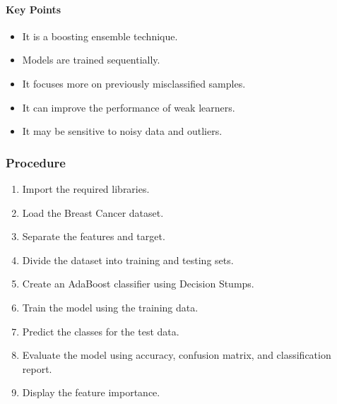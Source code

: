\documentclass[a4paper,11pt]{article}
\begin{document}
\paragraph{Key Points}
\begin{itemize}
    \item It is a boosting ensemble technique.
    \item Models are trained sequentially.
    \item It focuses more on previously misclassified samples.
    \item It can improve the performance of weak learners.
    \item It may be sensitive to noisy data and outliers.
\end{itemize}

\subsubsection{Procedure}
\begin{enumerate}
    \item Import the required libraries.
    \item Load the Breast Cancer dataset.
    \item Separate the features and target.
    \item Divide the dataset into training and testing sets.
    \item Create an AdaBoost classifier using Decision Stumps.
    \item Train the model using the training data.
    \item Predict the classes for the test data.
    \item Evaluate the model using accuracy, confusion matrix, and classification report.
    \item Display the feature importance.
\end{enumerate}
\end{document}
